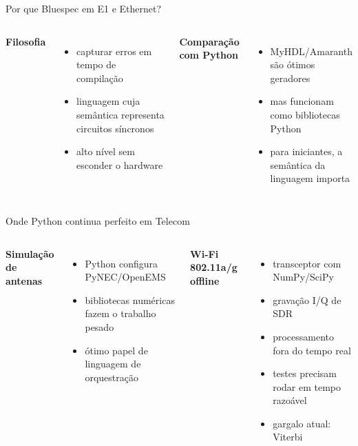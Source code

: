 \documentclass[aspectratio=169,11pt]{beamer}
\newcommand{\eyebrow}[1]{{\color{caipyraOrange}\small\bfseries #1}\par\vspace{0.25em}}
\newenvironment{tightitemize}{%
  \begin{itemize}\setlength{\itemsep}{0.25em}\setlength{\parskip}{0pt}
}{\end{itemize}}
\begin{document}
\begin{frame}{Por que Bluespec em E1 e Ethernet?}
  \begin{columns}[T,onlytextwidth]
    \eyebrow{Filosofia}
    \begin{tightitemize}
      \item capturar erros em tempo de compilação
      \item linguagem cuja semântica representa circuitos síncronos
      \item alto nível sem esconder o hardware
    \end{tightitemize}

    \eyebrow{Comparação com Python}
    \begin{tightitemize}
      \item MyHDL/Amaranth são ótimos geradores
      \item mas funcionam como bibliotecas Python
      \item para iniciantes, a semântica da linguagem importa
    \end{tightitemize}
  \end{columns}
\end{frame}

\begin{frame}{Onde Python continua perfeito em Telecom}
  \begin{columns}[T,onlytextwidth]
    \eyebrow{Simulação de antenas}
    \begin{tightitemize}
      \item Python configura PyNEC/OpenEMS
      \item bibliotecas numéricas fazem o trabalho pesado
      \item ótimo papel de linguagem de orquestração
    \end{tightitemize}

    \eyebrow{Wi-Fi 802.11a/g offline}
    \begin{tightitemize}
      \item transceptor com NumPy/SciPy
      \item gravação I/Q de SDR
      \item processamento fora do tempo real
      \item testes precisam rodar em tempo razoável
      \item gargalo atual: Viterbi
    \end{tightitemize}
  \end{columns}
\end{frame}
\end{document}
